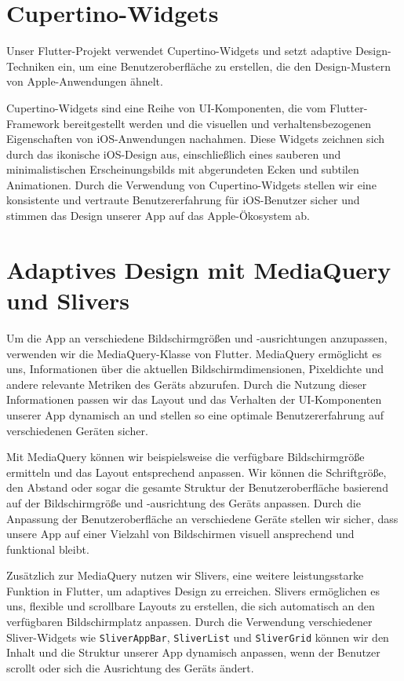 \section{Cupertino-Widgets}

Unser Flutter-Projekt verwendet Cupertino-Widgets und setzt adaptive Design-Techniken ein, um eine Benutzeroberfläche zu erstellen, die den Design-Mustern von Apple-Anwendungen ähnelt.

Cupertino-Widgets sind eine Reihe von UI-Komponenten, die vom Flutter-Framework bereitgestellt werden und die visuellen und verhaltensbezogenen Eigenschaften von iOS-Anwendungen nachahmen. Diese Widgets zeichnen sich durch das ikonische iOS-Design aus, einschließlich eines sauberen und minimalistischen Erscheinungsbilds mit abgerundeten Ecken und subtilen Animationen. Durch die Verwendung von Cupertino-Widgets stellen wir eine konsistente und vertraute Benutzererfahrung für iOS-Benutzer sicher und stimmen das Design unserer App auf das Apple-Ökosystem ab.

\section{Adaptives Design mit MediaQuery und Slivers}

Um die App an verschiedene Bildschirmgrößen und -ausrichtungen anzupassen, verwenden wir die MediaQuery-Klasse von Flutter. MediaQuery ermöglicht es uns, Informationen über die aktuellen Bildschirmdimensionen, Pixeldichte und andere relevante Metriken des Geräts abzurufen. Durch die Nutzung dieser Informationen passen wir das Layout und das Verhalten der UI-Komponenten unserer App dynamisch an und stellen so eine optimale Benutzererfahrung auf verschiedenen Geräten sicher.

Mit MediaQuery können wir beispielsweise die verfügbare Bildschirmgröße ermitteln und das Layout entsprechend anpassen. Wir können die Schriftgröße, den Abstand oder sogar die gesamte Struktur der Benutzeroberfläche basierend auf der Bildschirmgröße und -ausrichtung des Geräts anpassen. Durch die Anpassung der Benutzeroberfläche an verschiedene Geräte stellen wir sicher, dass unsere App auf einer Vielzahl von Bildschirmen visuell ansprechend und funktional bleibt.

Zusätzlich zur MediaQuery nutzen wir Slivers, eine weitere leistungsstarke Funktion in Flutter, um adaptives Design zu erreichen. Slivers ermöglichen es uns, flexible und scrollbare Layouts zu erstellen, die sich automatisch an den verfügbaren Bildschirmplatz anpassen. Durch die Verwendung verschiedener Sliver-Widgets wie \texttt{SliverAppBar}, \texttt{SliverList} und \texttt{SliverGrid} können wir den Inhalt und die Struktur unserer App dynamisch anpassen, wenn der Benutzer scrollt oder sich die Ausrichtung des Geräts ändert.

